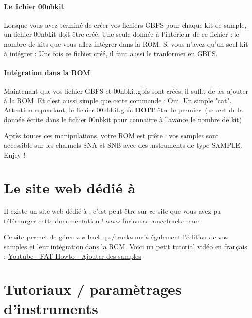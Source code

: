 \documentclass[12pt,a4paper]{article}
\begin{document}
    \paragraph{Le fichier 00nbkit} Lorsque vous avez terminé de créer vos fichiers GBFS pour chaque kit de sample, un fichier 00nbkit doit être créé.
    Une seule donnée à l'intérieur de ce fichier : le nombre de kits que vous allez intégrer dans la ROM.
    Si vous n'avez qu'un seul kit à intégrer :
    Une fois ce fichier créé, il faut aussi le tranformer en GBFS.

    \paragraph{Intégration dans la ROM} Maintenant que vos fichier GBFS et 00nbkit.gbfs sont créés, il suffit de les ajouter à la ROM.
    Et c'est aussi simple que cette commande :
    Oui. Un simple "cat".
    Attention cependant, le fichier 00nbkit.gbfs {\bf DOIT} être le premier.
    (\FAT se sert de la donnée écrite dans le fichier 00nbkit pour connaitre à l'avance le nombre de kit)
    \medskip

    Après toutes ces manipulations, votre ROM est prête : vos samples sont accessible sur les channels SNA et SNB avec des instruments de type SAMPLE. Enjoy !

    \newpage
    \section{Le site web dédié à \FAT}

    Il existe un site web dédié à \FAT : c'est peut-être sur ce site que vous avez pu télécharger cette documentation !
    \href{http://www.furiousadvancetracker.com}{www.furiousadvancetracker.com}
    \medskip

    Ce site permet de gérer vos backups/tracks mais également l'édition de vos samples et leur intégration dans la ROM.
    Voici un petit tutorial vidéo en français : \href{https://www.youtube.com/watch?v=a9rPzz-6Mgg}{Youtube - FAT Howto - Ajouter des samples}
    \medskip


    \newpage
    \section{Tutoriaux / paramètrages d'instruments}
\end{document}
